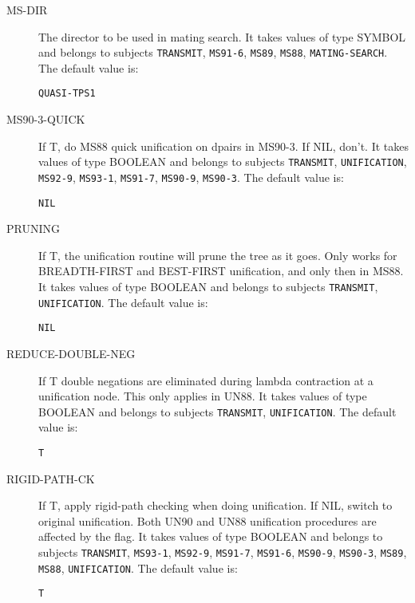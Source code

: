 \begin{description}
\item[MS-DIR]  
The director to be used in mating search.
It takes values of type SYMBOL and belongs to subjects \texttt{TRANSMIT}, \texttt{MS91-6}, \texttt{MS89}, \texttt{MS88}, \texttt{MATING-SEARCH}.  The default value is: \begin{lstlisting}
QUASI-TPS1
\end{lstlisting}

\item[MS90-3-QUICK]  
If T, do MS88 quick unification on dpairs in MS90-3.
If NIL, don't.
It takes values of type BOOLEAN and belongs to subjects \texttt{TRANSMIT}, \texttt{UNIFICATION}, \texttt{MS92-9}, \texttt{MS93-1}, \texttt{MS91-7}, \texttt{MS90-9}, \texttt{MS90-3}.  The default value is: \begin{lstlisting}
NIL
\end{lstlisting}

\item[PRUNING]  
If T, the unification routine will prune the tree as it goes.
Only works for BREADTH-FIRST and BEST-FIRST unification, and
only then in MS88.
It takes values of type BOOLEAN and belongs to subjects \texttt{TRANSMIT}, \texttt{UNIFICATION}.  The default value is: \begin{lstlisting}
NIL
\end{lstlisting}

\item[REDUCE-DOUBLE-NEG]  
If T double negations are eliminated during lambda contraction
at a unification node. This only applies in UN88.
It takes values of type BOOLEAN and belongs to subjects \texttt{TRANSMIT}, \texttt{UNIFICATION}.  The default value is: \begin{lstlisting}
T
\end{lstlisting}

\item[RIGID-PATH-CK]  
If T, apply rigid-path checking when doing unification. If NIL, 
switch to original unification. Both UN90 and UN88 unification 
procedures are affected by the flag.
It takes values of type BOOLEAN and belongs to subjects \texttt{TRANSMIT}, \texttt{MS93-1}, \texttt{MS92-9}, \texttt{MS91-7}, \texttt{MS91-6}, \texttt{MS90-9}, \texttt{MS90-3}, \texttt{MS89}, \texttt{MS88}, \texttt{UNIFICATION}.  The default value is: \begin{lstlisting}
T
\end{lstlisting}


\end{description}
